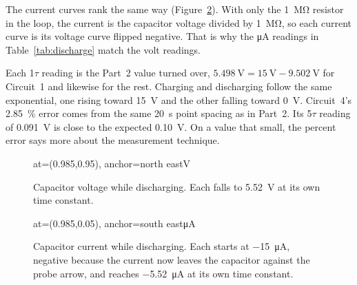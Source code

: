 \documentclass[offwhitecover]{lennylab}
\newcommand{\ntau}[1]{#1\(\tau\)}   %
\begin{document}
The current curves rank the same way (Figure~\ref{fig:discharge-i}). With only the \qty{1}{\mega\ohm} resistor in the loop, the current is the capacitor voltage divided by \qty{1}{\mega\ohm}, so each current curve is its voltage curve flipped negative. That is why the \unit{\micro\ampere} readings in Table~\ref{tab:discharge} match the volt readings.

Each \ntau{1} reading is the Part~2 value turned over, $\qty{5.498}{\volt} = \qty{15}{\volt} - \qty{9.502}{\volt}$ for Circuit~1 and likewise for the rest. Charging and discharging follow the same exponential, one rising toward \qty{15}{\volt} and the other falling toward \qty{0}{\volt}. Circuit~4's \qty{+2.85}{\percent} error comes from the same \qty{20}{\second} point spacing as in Part~2. Its \ntau{5} reading of \qty{0.091}{\volt} is close to the expected \qty{0.10}{\volt}. On a value that small, the percent error says more about the measurement technique.

\begin{figure}
    {at={(0.985,0.95)}, anchor=north east}{V}
  \caption{Capacitor voltage while discharging. Each falls to \qty{5.52}{\volt} at its own time constant.}
  \label{fig:discharge-v}
\end{figure}

\begin{figure}
    {at={(0.985,0.05)}, anchor=south east}{\unit{\micro\ampere}}
  \caption{Capacitor current while discharging. Each starts at \qty{-15}{\micro\ampere}, negative because the current now leaves the capacitor against the probe arrow, and reaches \qty{-5.52}{\micro\ampere} at its own time constant.}
  \label{fig:discharge-i}
\end{figure}
\end{document}

